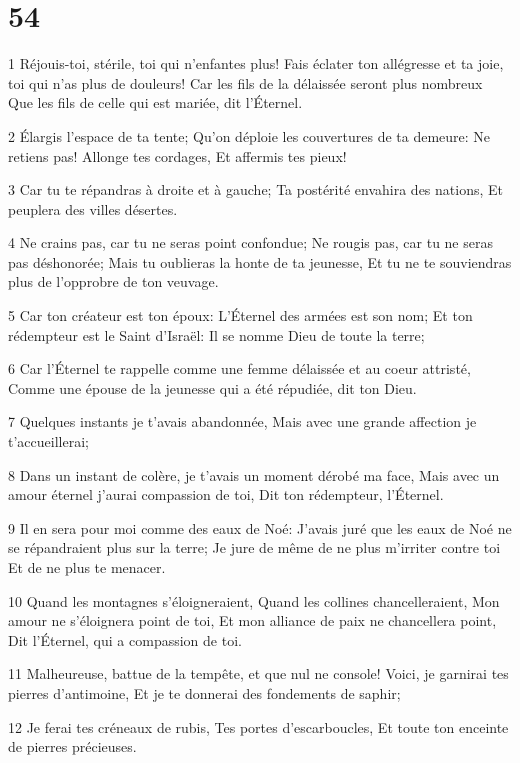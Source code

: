 \chapter{54}

\par 1 Réjouis-toi, stérile, toi qui n'enfantes plus! Fais éclater ton allégresse et ta joie, toi qui n'as plus de douleurs! Car les fils de la délaissée seront plus nombreux Que les fils de celle qui est mariée, dit l'Éternel.
\par 2 Élargis l'espace de ta tente; Qu'on déploie les couvertures de ta demeure: Ne retiens pas! Allonge tes cordages, Et affermis tes pieux!
\par 3 Car tu te répandras à droite et à gauche; Ta postérité envahira des nations, Et peuplera des villes désertes.
\par 4 Ne crains pas, car tu ne seras point confondue; Ne rougis pas, car tu ne seras pas déshonorée; Mais tu oublieras la honte de ta jeunesse, Et tu ne te souviendras plus de l'opprobre de ton veuvage.
\par 5 Car ton créateur est ton époux: L'Éternel des armées est son nom; Et ton rédempteur est le Saint d'Israël: Il se nomme Dieu de toute la terre;
\par 6 Car l'Éternel te rappelle comme une femme délaissée et au coeur attristé, Comme une épouse de la jeunesse qui a été répudiée, dit ton Dieu.
\par 7 Quelques instants je t'avais abandonnée, Mais avec une grande affection je t'accueillerai;
\par 8 Dans un instant de colère, je t'avais un moment dérobé ma face, Mais avec un amour éternel j'aurai compassion de toi, Dit ton rédempteur, l'Éternel.
\par 9 Il en sera pour moi comme des eaux de Noé: J'avais juré que les eaux de Noé ne se répandraient plus sur la terre; Je jure de même de ne plus m'irriter contre toi Et de ne plus te menacer.
\par 10 Quand les montagnes s'éloigneraient, Quand les collines chancelleraient, Mon amour ne s'éloignera point de toi, Et mon alliance de paix ne chancellera point, Dit l'Éternel, qui a compassion de toi.
\par 11 Malheureuse, battue de la tempête, et que nul ne console! Voici, je garnirai tes pierres d'antimoine, Et je te donnerai des fondements de saphir;
\par 12 Je ferai tes créneaux de rubis, Tes portes d'escarboucles, Et toute ton enceinte de pierres précieuses.
